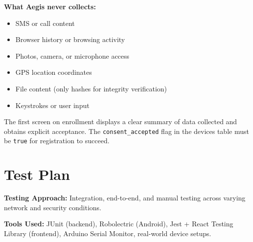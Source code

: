 \documentclass[12pt,a4paper]{report}
\begin{document}
\textbf{What Aegis never collects:}
\begin{itemize}[leftmargin=*, noitemsep]
  \item SMS or call content
  \item Browser history or browsing activity
  \item Photos, camera, or microphone access
  \item GPS location coordinates
  \item File content (only hashes for integrity verification)
  \item Keystrokes or user input
\end{itemize}

The first screen on enrollment displays a clear summary of data collected and obtains explicit acceptance. The \texttt{consent\_accepted} flag in the devices table must be \texttt{true} for registration to succeed.

\chapter{Test Plan}

\textbf{Testing Approach:} Integration, end-to-end, and manual testing across varying network and security conditions.

\textbf{Tools Used:} JUnit (backend), Robolectric (Android), Jest + React Testing Library (frontend), Arduino Serial Monitor, real-world device setups.
\end{document}
